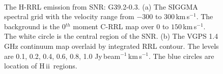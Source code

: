 \documentclass[manuscript]{aastex61}
\newcommand{\hii}{{\rm H\,}{{\sc ii}}}
\newcommand{\kms}{\,km\,s$^{-1}$}
\begin{document}
\begin{figure}[H]
\centering
{}
\\
\caption{The H-RRL emission from SNR: G39.2-0.3.
          (a) The SIGGMA spectral grid with the velocity range from $-300$ to $300$\kms.
	  The background is the 0$^{th}$ moment C-RRL map over $0$ to $150$\kms.
	  The white circle is the central region of the SNR.
	  (b) The VGPS 1.4 GHz continuum map overlaid by integrated RRL contour.
	  The levels are 0.1, 0.2, 0.4, 0.6, 0.8, 1.0 Jy\,beam$^{-1}$\kms.
	  The blue circles are location of \hii\ regions.
	  }
\label{fig_snr-g392}
\end{figure}
\end{document}
